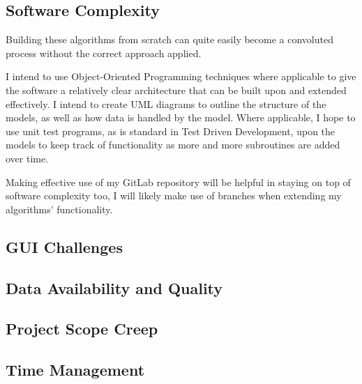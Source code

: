 \documentclass[report,10pt]{article}
\begin{document}
\subsection{Software Complexity}
Building these algorithms from scratch can quite easily become a convoluted process without the correct approach applied. \par
I intend to use Object-Oriented Programming techniques where applicable to give the software a relatively clear architecture that can be built upon and extended effectively. I intend to create UML diagrams to outline the structure of the models, as well as how data is handled by the model. Where applicable, I hope to use unit test programs, as is standard in Test Driven Development, upon the models to keep track of functionality as more and more subroutines are added over time. \par
Making effective use of my GitLab repository will be helpful in staying on top of software complexity too, I will likely make use of branches when extending my algorithms' functionality. \par
\subsection{GUI Challenges}
\subsection{Data Availability and Quality}
\subsection{Project Scope Creep}
\subsection{Time Management}

\pagebreak


\end{document}
